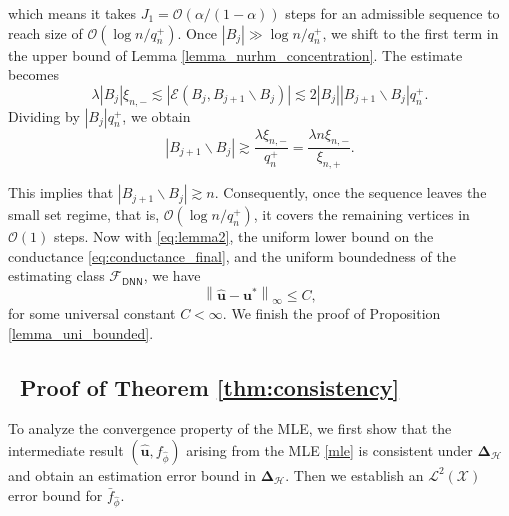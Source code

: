 \documentclass[
  12pt]{article}
\begin{document}
\noindent which means it takes $J_1 = \mathcal{O} (\alpha/(1-\alpha))$ steps for an admissible sequence to reach size of $\mathcal{O}(\log n/q_{n}^{+})$. Once $|B_j| \gg {\log n}/{q_{n}^{+}}$, we shift to the first term in the upper bound of Lemma \ref{lemma_nurhm_concentration}. The estimate becomes
$$
\lambda |B_j| \xi_{n,-} \lesssim |\mathcal{E}(B_j, B_{j+1} \backslash B_j)| \lesssim 2 |B_j||B_{j+1} \backslash B_j| q_{n}^{+}.
$$
Dividing by $|B_j| q_{n}^{+}$, we obtain
\begin{equation}\label{B_j+1_expansion}
    |B_{j+1} \backslash B_j| \gtrsim \frac{\lambda \xi_{n,-}}{q_{n}^{+}} = \frac{\lambda n \xi_{n,-}}{\xi_{n,+}}.
\end{equation}

\noindent This implies that $|B_{j+1} \backslash B_j| \gtrsim n$.  Consequently, once the sequence leaves the small set regime, that is, $\mathcal{O}(\log n/q_{n}^{+})$, it covers the remaining vertices in $\mathcal{O}(1)$ steps. Now with \eqref{eq:lemma2}, the uniform lower bound on the conductance \eqref{eq:conductance_final}, and the uniform boundedness of the estimating class $\mathcal{F}_{\mathsf{DNN}}$, we have $$\left\|\widehat{\boldsymbol{u}}-\boldsymbol{u}^*\right\|_{\infty} \leq C,$$
for some universal constant $C<\infty$.
We finish the proof of Proposition \ref{lemma_uni_bounded}.

\subsection{~Proof of Theorem \ref{thm:consistency}}
To analyze the convergence property of the MLE, we first show that the intermediate result $(\widehat{\boldsymbol{u}}, f_{\widehat{\phi}})$ arising from the MLE \eqref{mle} is consistent under $\mathbf{\Delta}_{\mathcal{H}}$ and obtain an estimation error bound in $\mathbf{\Delta}_{\mathcal{H}}$. Then we establish an $\mathcal{L}^2(\mathcal{X})$ error bound for $ \bar{f}_{\widehat{\phi}}$.
\end{document}
